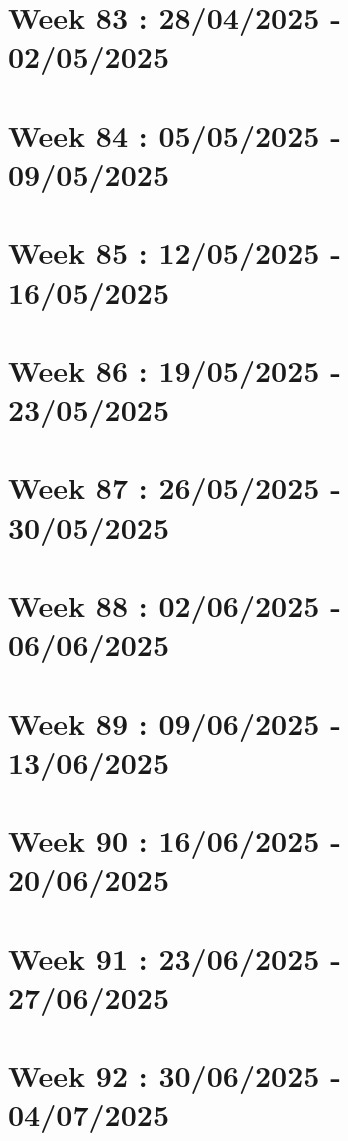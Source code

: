 \documentclass[french]{article}
\begin{document}
	\section{Week 83 : 28/04/2025 - 02/05/2025}

	\section{Week 84 : 05/05/2025 - 09/05/2025}

	\section{Week 85 : 12/05/2025 - 16/05/2025}

	\section{Week 86 : 19/05/2025 - 23/05/2025}

	\section{Week 87 : 26/05/2025 - 30/05/2025}

	\section{Week 88 : 02/06/2025 - 06/06/2025}

	\section{Week 89 : 09/06/2025 - 13/06/2025}

	\section{Week 90 : 16/06/2025 - 20/06/2025}

	\section{Week 91 : 23/06/2025 - 27/06/2025}

	\section{Week 92 : 30/06/2025 - 04/07/2025}
\end{document}
